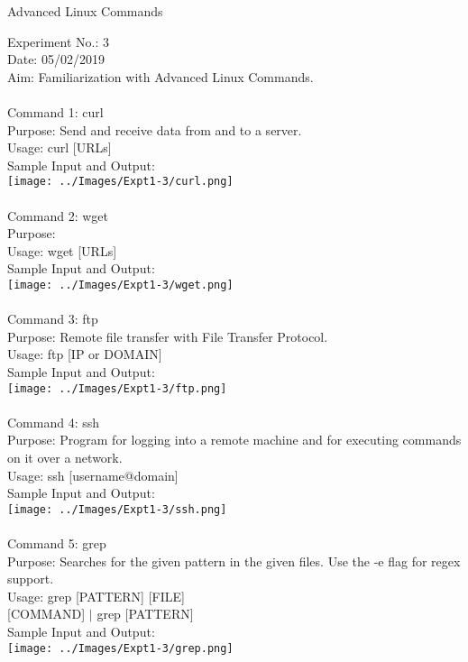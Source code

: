 \documentclass[10pt,a4paper]{report}
\begin{document}
\begin{center}
\begin{Large}
Advanced Linux Commands
\end{Large}
\end{center}
Experiment No.: 3\\
Date: 05/02/2019\\
Aim: Familiarization with Advanced Linux Commands.\\
\\
Command 1: curl\\
Purpose: Send and receive data from and to a server.\\
Usage: curl [URLs]\\
Sample Input and Output: \\
\texttt{[image: ../Images/Expt1-3/curl.png]}\\
\\
Command 2: wget\\
Purpose: \\
Usage: wget [URLs]\\
Sample Input and Output: \\
\texttt{[image: ../Images/Expt1-3/wget.png]}\\
\\
Command 3: ftp\\
Purpose: Remote file transfer with File Transfer Protocol.\\
Usage: ftp [IP or DOMAIN]\\
Sample Input and Output: \\
\texttt{[image: ../Images/Expt1-3/ftp.png]}\\
\pagebreak
\\
Command 4: ssh\\
Purpose: Program for logging into a remote machine and for executing commands on it over a network.\\
Usage: ssh [username@domain]\\
Sample Input and Output: \\
\texttt{[image: ../Images/Expt1-3/ssh.png]}\\
\\
Command 5: grep\\
Purpose: Searches for the given pattern in the given files. Use the -e flag for regex support.\\
Usage: grep [PATTERN] [FILE]\\
{[COMMAND]} $|$ grep [PATTERN]\\
Sample Input and Output: \\
\texttt{[image: ../Images/Expt1-3/grep.png]}
\end{document}
